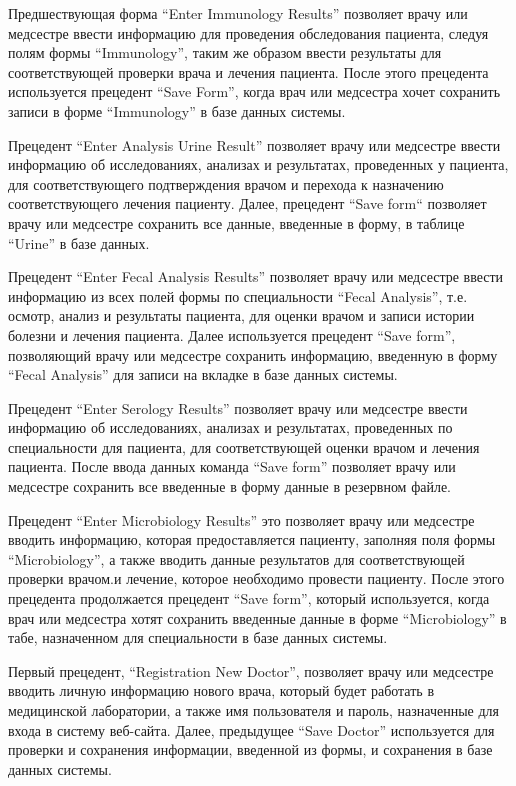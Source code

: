 Предшествующая форма ``Enter Immunology Results'' позволяет врачу или медсестре ввести информацию для проведения обследования пациента, следуя полям формы ``Immunology'', таким же образом ввести результаты для соответствующей проверки врача и лечения пациента. После этого прецедента используется прецедент ``Save Form'', когда врач или медсестра хочет сохранить записи в форме ``Immunology'' в базе данных системы.

Прецедент ``Enter Analysis Urine Result'' позволяет врачу или медсестре ввести информацию об исследованиях, анализах и результатах, проведенных у пациента, для соответствующего подтверждения врачом и перехода к назначению соответствующего лечения пациенту. Далее, прецедент ``Save form`` позволяет врачу или медсестре сохранить все данные, введенные в форму, в таблице ``Urine'' в базе данных.

Прецедент ``Enter Fecal Analysis Results'' позволяет врачу или медсестре ввести информацию из всех полей формы по специальности ``Fecal Analysis'', т.е. осмотр, анализ и результаты пациента, для оценки врачом и записи истории болезни и лечения пациента. Далее используется прецедент ``Save form'', позволяющий врачу или медсестре сохранить информацию, введенную в форму ``Fecal Analysis'' для записи на вкладке в базе данных системы.

Прецедент ``Enter Serology Results'' позволяет врачу или медсестре ввести информацию об исследованиях, анализах и результатах, проведенных по специальности для пациента, для соответствующей оценки врачом и лечения пациента. После ввода данных команда ``Save form'' позволяет врачу или медсестре сохранить все введенные в форму данные в резервном файле.

Прецедент ``Enter Microbiology Results'' это позволяет врачу или медсестре вводить информацию, которая предоставляется пациенту, заполняя поля формы ``Microbiology'', а также вводить данные результатов для соответствующей проверки врачом.и лечение, которое необходимо провести пациенту. После этого прецедента продолжается прецедент ``Save form'', который используется, когда врач или медсестра хотят сохранить введенные данные в форме ``Microbiology'' в табе, назначенном для специальности в базе данных системы.

Первый прецедент, ``Registration New Doctor'', позволяет врачу или медсестре вводить личную информацию нового врача, который будет работать в медицинской лаборатории, а также имя пользователя и пароль, назначенные для входа в систему веб-сайта. Далее, предыдущее ``Save Doctor'' используется для проверки и сохранения информации, введенной из формы, и сохранения в базе данных системы.

